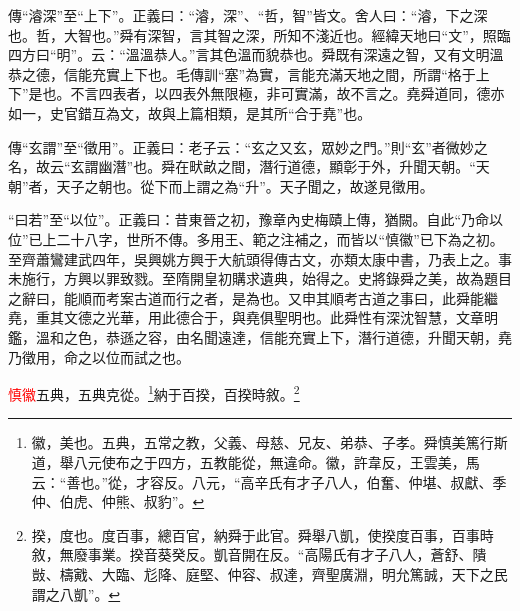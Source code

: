 {\noindent\zhuan{}\fzbyks 傳“濬深”至“上下”。正義曰：“濬，深”、“哲，智”皆文。舍人曰：“濬，下之深也。哲，大智也。”舜有深智，言其智之深，所知不淺近也。經緯天地曰“文”，照臨四方曰“明”。云：“溫溫恭人。”言其色溫而貌恭也。舜既有深遠之智，又有文明溫恭之德，信能充實上下也。毛傳訓“塞”為實，言能充滿天地之間，所謂“格于上下”是也。不言四表者，以四表外無限極，非可實滿，故不言之。堯舜道同，德亦如一，史官錯互為文，故與上篇相類，是其所“合于堯”也。 \par}

{\noindent\zhuan{}\fzbyks 傳“玄謂”至“徵用”。正義曰：老子云：“玄之又玄，眾妙之門。”則“玄”者微妙之名，故云“玄謂幽潛”也。舜在畎畝之間，潛行道德，顯彰于外，升聞天朝。“天朝”者，天子之朝也。從下而上謂之為“升”。天子聞之，故遂見徵用。 \par}

{\noindent\shu{}\fzkt “曰若”至“以位”。正義曰：昔東晉之初，豫章內史梅賾上傳，猶闕。自此“乃命以位”已上二十八字，世所不傳。多用王、範之注補之，而皆以“慎徽”已下為之初。至齊蕭鸞建武四年，吳興姚方興于大航頭得傳古文，亦類太康中書，乃表上之。事未施行，方興以罪致戮。至隋開皇初購求遺典，始得之。史將錄舜之美，故為題目之辭曰，能順而考案古道而行之者，是為也。又申其順考古道之事曰，此舜能繼堯，重其文德之光華，用此德合于，與堯俱聖明也。此舜性有深沈智慧，文章明鑑，溫和之色，恭遜之容，由名聞遠達，信能充實上下，潛行道德，升聞天朝，堯乃徵用，命之以位而試之也。 \par}

\textcolor{red}{慎徽}五典，五典克從。\footnote{徽，美也。五典，五常之教，父義、母慈、兄友、弟恭、子孝。舜慎美篤行斯道，舉八元使布之于四方，五教能從，無違命。徽，許韋反，王雲美，馬云：“善也。”從，才容反。八元，“高辛氏有才子八人，伯奮、仲堪、叔獻、季仲、伯虎、仲熊、叔豹”。}納于百揆，百揆時敘。\footnote{揆，度也。度百事，總百官，納舜于此官。舜舉八凱，使揆度百事，百事時敘，無廢事業。揆音葵癸反。凱音開在反。“高陽氏有才子八人，蒼舒、隤敱、檮戭、大臨、尨降、庭堅、仲容、叔達，齊聖廣淵，明允篤誠，天下之民謂之八凱”。}

